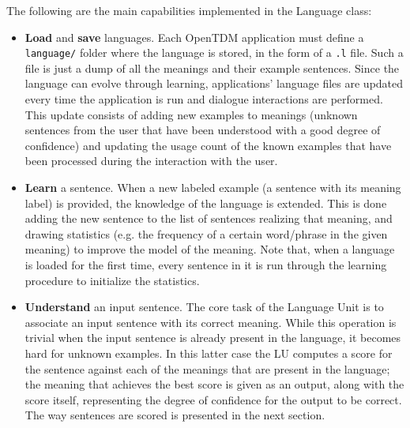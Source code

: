 The following are the main capabilities implemented in the Language class:
\begin{itemize}
	\item \textbf{Load} and \textbf{save} languages. Each OpenTDM application must define a \texttt{language/} folder where the language is stored, in the form of a \texttt{.l} file. Such a file is just a dump of all the meanings and their example sentences. Since the language  can evolve through learning, applications' language files are updated every time the application is run and dialogue interactions are performed. This update consists of adding new examples to meanings (unknown sentences from the user that have been understood with a good degree of confidence) and updating the usage count of the known examples that have been processed during the interaction with the user.
	\item \textbf{Learn} a sentence. When a new labeled example (a sentence with its meaning label) is provided, the knowledge of the language is extended. This is done adding the new sentence to the list of sentences realizing that meaning, and drawing statistics (e.g. the frequency of a certain word/phrase in the given meaning) to improve the model of the meaning. Note that, when a language is loaded for the first time, every sentence in it is run through the learning procedure to initialize the statistics.
	\item \textbf{Understand} an input sentence. The core task of the Language Unit is to associate an input sentence with its correct meaning. While this operation is trivial when the input sentence is already present in the language, it becomes hard for unknown examples. In this latter case the LU computes a score for the sentence against each of the meanings that are present in the language; the meaning that achieves the best score is given as an output, along with the score itself, representing the degree of confidence for the output to be correct. The way sentences are scored is presented in the next section.
\end{itemize}

